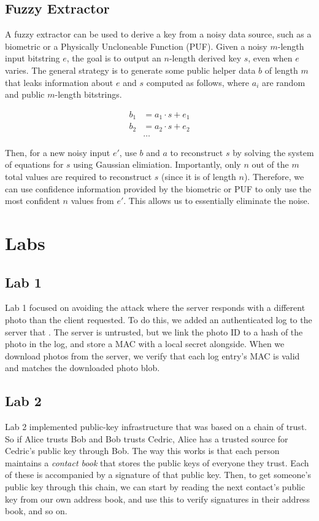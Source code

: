 \documentclass{article}
\begin{document}
\begin{multicols*}{2}
\subsection{Fuzzy Extractor}
A fuzzy extractor can be used to derive a key from a noisy data source, such as a biometric or a Physically Uncloneable Function (PUF). Given a noisy $m$-length input bitstring $e$, the goal is to output an $n$-length derived key $s$, even when $e$ varies. The general strategy is to generate some public helper data $b$ of length $m$ that leaks information about $e$ and $s$ computed as follows, where $a_i$ are random and public $m$-length bitstrings.

\[
	\begin{aligned}
		b_1 & = a_1 \cdot s + e_1 \\
		b_2 & = a_2 \cdot s + e_2 \\
				& \ldots
	\end{aligned}
\]

Then, for a new noisy input $e'$, use $b$ and $a$ to reconstruct $s$ by solving the system of equations for $s$ using Gaussian elimiation. Importantly, only $n$ out of the $m$ total values are required to reconstruct $s$ (since it is of length $n$). Therefore, we can use confidence information provided by the biometric or PUF to only use the most confident $n$ values from $e'$. This allows us to essentially eliminate the noise.

\section{Labs}
\subsection{Lab 1}
Lab 1 focused on avoiding the attack where the server responds with a different photo than the client requested. To do this, we added an authenticated log to the server that . The server is untrusted, but we link the photo ID to a hash of the photo in the log, and store a MAC with a local secret alongside. When we download photos from the server, we verify that each log entry's MAC is valid and matches the downloaded photo blob.

\subsection{Lab 2}
Lab 2 implemented public-key infrastructure that was based on a chain of trust. So if Alice trusts Bob and Bob trusts Cedric, Alice has a trusted source for Cedric's public key through Bob. The way this works is that each person maintains a \textit{contact book} that stores the public keys of everyone they trust. Each of these is accompanied by a signature of that public key. Then, to get someone's public key through this chain, we can start by reading the next contact's public key from our own address book, and use this to verify signatures in their address book, and so on. 


\end{multicols*}
\end{document}
